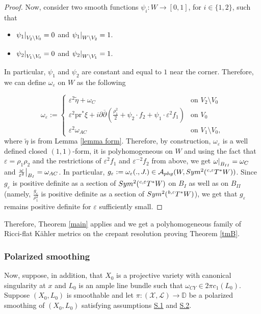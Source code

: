 \documentclass[a4paper,11pt]{article}
\newcommand\restr[2]{{%
  \left.\kern-\nulldelimiterspace %
  #1 %
  \littletaller %
  \right|_{#2} %
  }}
\newcommand{\littletaller}{\mathchoice{\vphantom{\big|}}{}{}{}}
\begin{document}
\begin{proof}
Now, consider two smooth functions $\psi_i : W \rightarrow [0,1]$, for $i \in \{1,2\}$, such that
\begin{itemize}
    \item $\restr{\psi_1}{V_2 \setminus V_0} =0$ and $\restr{\psi_1}{W \setminus V_2}=1$.
    \item $\restr{\psi_2}{V_1 \setminus V_0} =0$ and $\restr{\psi_2}{W \setminus V_1}=1$.
\end{itemize}
In particular, $\psi_1$ and $\psi_2$ are constant and equal to $1$ near the corner. Therefore, we can define $\omega_\varepsilon$ on $W$ as the following

$$
 \omega_\varepsilon := 
\begin{cases}
   \varepsilon^2 \tilde \eta + \omega_C & \text{on $V_2 \setminus V_0$}\\
   \varepsilon^2 \mathrm{pr}^* \xi + i \partial \overline{\partial} \left( \frac{\rho_1^2}{2} +  \psi_2 \cdot f_2 + \psi_1 \cdot \varepsilon^2 f_1 \right) & \text{on $V_0$}\\
   \varepsilon^2 \omega_{AC} & \text{on $V_1 \setminus V_0$},
\end{cases}
$$
where $\tilde \eta$ is from Lemma \ref{lemma form}. Therefore, by construction, $\omega_\varepsilon$ is a well defined closed $(1,1)$-form, it is polyhomogeneous on $W$ and using the fact that $\varepsilon = \rho_1 \rho_2$ and the restrictions of $\varepsilon^2 f_1$ and $\varepsilon^{-2}f_2$ from above, we get $\restr{\omega}{B_{II}} = \omega_C$ and $\restr{\frac{\omega}{\varepsilon^2}}{B_I}= \omega_{AC}$. In particular, $g_\varepsilon := \omega_\varepsilon (., J.) \in \mathcal{A}_{phg}(W, Sym^2(\hspace{0.01cm} ^{c,\varepsilon} T^{*} W))$. Since $g_\varepsilon$ is positive definite as a section of $Sym^2(\hspace{0.01cm} ^{c,\varepsilon} T^{*} W)$ on $B_{I}$ as well as on $B_{II}$ (namely, $\frac{g_\varepsilon}{\rho_1^2}$ is positive definite as a section of $Sym^2(\hspace{0.01cm} ^{b,\varepsilon} T^{*} W)$), we get that $g_\varepsilon$ remains positive definite for $\varepsilon$ sufficiently small.
\end{proof}
Therefore, Theorem \ref{main} applies and we get a polyhomogeneous family of Ricci-flat Kähler metrics on the crepant resolution proving Theorem \ref{tmB}.

\subsubsection{Polarized smoothing} \label{polarized smoothing}
Now, suppose, in addition, that $X_0$ is a projective variety with canonical singularity at $x$ and $L_0$ is an ample line bundle such that $\omega_{CY} \in 2 \pi c_1(L_0)$. Suppose $(X_0, L_0)$ is smoothable and let $\pi : (\mathcal{X}, \mathcal{L}) \rightarrow \mathbb{D}$ be a polarized smoothing of $(X_0, L_0)$ satisfying assumptions \hyperlink{S.1}{S.1} and \hyperlink{S.2}{S.2}.\\
\end{document}
